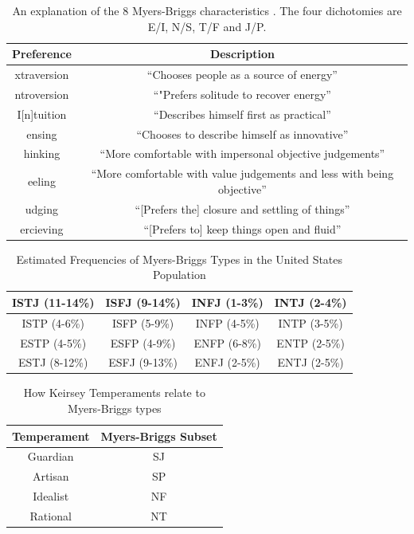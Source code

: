 \documentclass[12pt,a4paper,twoside]{report}
\begin{document}
\begin{table}
	\begin{center}
	\begin{tabular}{|c|c|}
		\hline Preference & Description \\ 
		\hline [E]xtraversion & ``Chooses people as a source of energy'' \\ 
		\hline [I]ntroversion & ``"Prefers solitude to recover energy'' \\ 
		\hline I[n]tuition & ``Describes himself first as practical'' \\ 
		\hline [S]ensing & ``Chooses to describe himself as innovative'' \\ 
		\hline [T]hinking & ``More comfortable with impersonal objective judgements'' \\ 
		\hline [F]eeling & ``More comfortable with value judgements and less with being objective'' \\ 
		\hline [J]udging & ``[Prefers the] closure and settling of things'' \\ 
		\hline [P]ercieving & ``[Prefers to] keep things open and fluid'' \\ 
		\hline 
	\end{tabular}
	\end{center}
	\caption{An explanation of the 8 Myers-Briggs characteristics \cite{myers1995gifts}. The four dichotomies are E/I, N/S, T/F and J/P.}
	\label{table:type}
\end{table}

\begin{table}
\begin{center}
\begin{tabular}{|c|c|c|c|}
	\hline ISTJ (11-14\%) & ISFJ (9-14\%) & INFJ (1-3\%) & INTJ (2-4\%) \\ 
	\hline ISTP (4-6\%) & ISFP (5-9\%) & INFP (4-5\%) & INTP (3-5\%) \\ 
	\hline ESTP (4-5\%) & ESFP (4-9\%) & ENFP (6-8\%) & ENTP (2-5\%) \\ 
	\hline ESTJ (8-12\%) & ESFJ (9-13\%) & ENFJ (2-5\%) & ENTJ (2-5\%) \\ 
	\hline 
\end{tabular}
\end{center}
\caption{Estimated Frequencies of Myers-Briggs Types in the United States Population \cite{mb-freq}}
\label{table:freq}
\end{table}

\begin{table}
\begin{center}
	\begin{tabular}{|c|c|}
		\hline Temperament & Myers-Briggs Subset \\ 
		\hline Guardian & SJ \\ 
		\hline Artisan & SP \\ 
		\hline Idealist & NF \\ 
		\hline Rational & NT \\ 
		\hline 
	\end{tabular} 
\end{center}
\caption{How Keirsey Temperaments relate to Myers-Briggs types \cite{keirsey1998please}}
\label{table:map}
\end{table}
\end{document}
